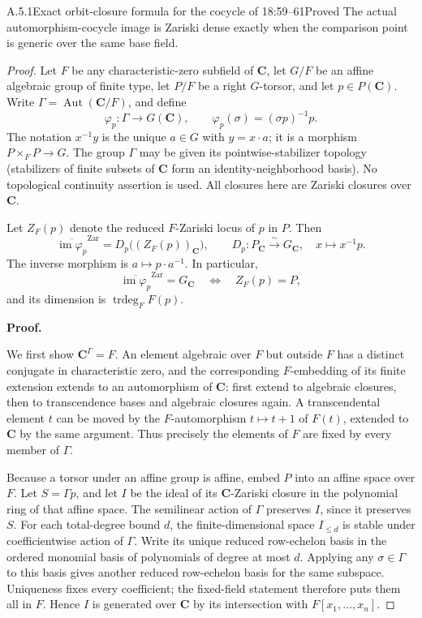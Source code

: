 \begin{result}{A.5.1}{Exact orbit-closure formula for the cocycle of 18:59--61}{Proved}
The actual automorphism-cocycle image is Zariski dense exactly when the comparison point is generic over the same base field.
\end{result}
\begin{proof}
Let \(F\) be any characteristic-zero subfield of \(\mathbf C\), let
\(G/F\) be an affine algebraic group of finite type, let \(P/F\) be a
right \(G\)-torsor, and let \(p\in P(\mathbf C)\). Write
\(\Gamma=\operatorname{Aut}(\mathbf C/F)\), and define
\[
\varphi_p:\Gamma\longrightarrow G(\mathbf C),\qquad
\varphi_p(\sigma)=(\sigma p)^{-1}p.
\]
The notation \(x^{-1}y\) is the unique \(a\in G\) with \(y=x\cdot a\);
it is a morphism \(P\times_F P\to G\). The group \(\Gamma\) may be
given its pointwise-stabilizer topology (stabilizers of finite subsets of
\(\mathbf C\) form an identity-neighborhood basis). No topological
continuity assertion is used. All closures here are Zariski closures over
\(\mathbf C\).

Let \(Z_F(p)\) denote the reduced \(F\)-Zariski locus of \(p\) in
\(P\). Then
\[
\overline{\operatorname{im}\varphi_p}^{\mathrm{Zar}}
=D_p\bigl((Z_F(p))_{\mathbf C}\bigr),\qquad
D_p:P_{\mathbf C}\overset\sim\longrightarrow G_{\mathbf C},
\quad x\longmapsto x^{-1}p.
\tag{A5.1.1}
\]
The inverse morphism is \(a\mapsto p\cdot a^{-1}\). In particular,
\[
\overline{\operatorname{im}\varphi_p}^{\mathrm{Zar}}=G_{\mathbf C}
\quad\Longleftrightarrow\quad Z_F(p)=P,
\tag{A5.1.2}
\]
and its dimension is \(\operatorname{trdeg}_F F(p)\).

\textbf{Proof.}

We first show \(\mathbf C^{\Gamma}=F\). An element algebraic over
\(F\) but outside \(F\) has a distinct conjugate in characteristic zero,
and the corresponding \(F\)-embedding of its finite extension extends to
an automorphism of \(\mathbf C\): first extend to algebraic closures, then
to transcendence bases and algebraic closures again. A transcendental
element \(t\) can be moved by the \(F\)-automorphism \(t\mapsto t+1\) of
\(F(t)\), extended to \(\mathbf C\) by the same argument. Thus precisely
the elements of \(F\) are fixed by every member of \(\Gamma\).

Because a torsor under an affine group is affine, embed \(P\) into an
affine space over \(F\). Let \(S=\Gamma p\), and let \(I\) be the ideal
of its \(\mathbf C\)-Zariski closure in the polynomial ring of that affine
space. The semilinear action of \(\Gamma\) preserves \(I\), since it
preserves \(S\). For each total-degree bound \(d\), the finite-dimensional
space \(I_{\le d}\) is stable under coefficientwise action of \(\Gamma\).
Write its unique reduced row-echelon basis in the ordered monomial basis
of polynomials of degree at most \(d\). Applying any \(\sigma\in\Gamma\)
to this basis gives another reduced row-echelon basis for the same
subspace. Uniqueness fixes every coefficient; the fixed-field statement
therefore puts them all in \(F\). Hence \(I\) is generated over
\(\mathbf C\) by its intersection with \(F[x_1,\ldots,x_n]\).


\end{proof}
